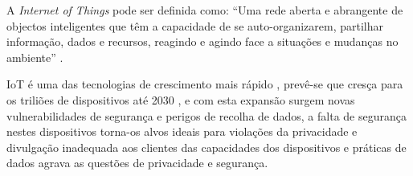 \documentclass[conference]{IEEEtran}
\begin{document}

A \textit{Internet of Things} pode ser definida como: ``Uma rede aberta e
abrangente de objectos inteligentes que têm a capacidade de se auto-organizarem,
partilhar informação, dados e recursos, reagindo e agindo face a situações
e mudanças no ambiente'' \cite{madakam2015internet}.


IoT é uma das tecnologias de crescimento mais rápido \cite{MohammadState},
prevê-se que cresça para os triliões de dispositivos até 2030 \cite{SarawiInternet},
e com esta expansão surgem novas vulnerabilidades de segurança e perigos
de recolha de dados, a falta de segurança nestes dispositivos torna-os alvos
ideais para violações da privacidade e divulgação inadequada aos clientes
das capacidades dos dispositivos e práticas de dados agrava as questões de
privacidade e segurança.

\end{document}
